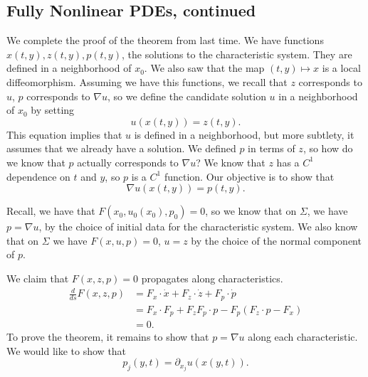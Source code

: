 \documentclass[12pt]{scrartcl}
\begin{document}
\subsection{Fully Nonlinear PDEs, continued}
We complete the proof of the theorem from last time. 
We have functions $x(t, y), z(t, y), p(t, y)$, the solutions to the characteristic system.   They are defined in a neighborhood of $x_0$.    We also saw that the map $(t, y) \mapsto x$ is a local diffeomorphism.  Assuming we have this functions, we recall that $z$ corresponds to $u$, $p$ corresponds to $\nabla u$, so we define the candidate solution $u$ in a neighborhood of $x_0$ by setting
$$u(x(t, y)) = z(t, y).$$
This equation implies that $u$ is defined in a neighborhood, but more subtlety, it assumes that we already have a solution.  We defined $p$ in terms of $z$, so how do we know that $p$ actually corresponds to $\nabla u$?  We know that $z$ has a $C^1$ dependence on $t$ and $y$, so $p$ is a $C^1$ function.   Our objective is to show that 
$$\nabla u(x(t, y)) = p(t, y).$$

Recall, we have that $F(x_0, u_0(x_0), p_0) = 0$, so we know that on $\Sigma$, we have $p = \nabla u$, by the choice of initial data for the characteristic system.  We also know that on $\Sigma$ we have $F(x, u, p) = 0$, $u = z$ by the choice of the normal component of $p$.  

We claim that $F(x, z, p) = 0$ propagates along characteristics.  
\begin{align*}
\frac{d}{ds} F(x, z, p) &= F_x\cdot \dot x  + F_z \cdot \dot z + F_p \cdot \dot p \\
&= F_x \cdot F_p + F_z F_p \cdot p - F_p(F_z \cdot p - F_x)\\
&= 0.
\end{align*}
To prove the theorem, it remains to show that $p = \nabla u$ along each characteristic.  We would like to show that $$p_j(y, t) = \partial_{x_j}u(x(y, t)).$$
\end{document}
